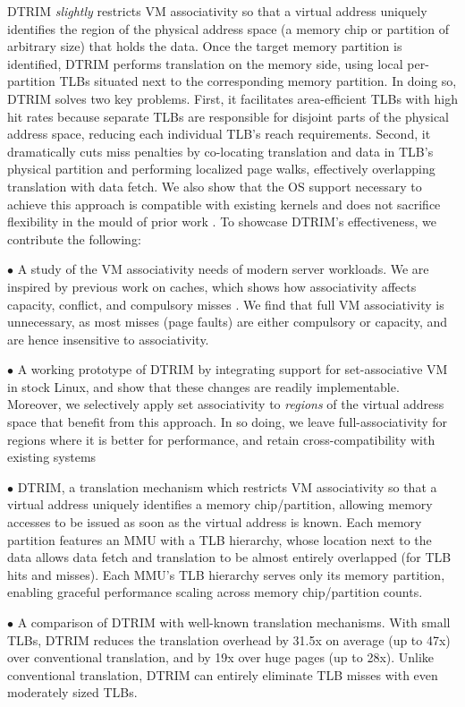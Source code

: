 DTRIM {\it slightly} restricts VM associativity so that a virtual
address uniquely identifies the region of the physical address space
(a memory chip or partition of arbitrary size) that holds the
data. Once the target memory partition is identified, DTRIM performs
translation on the memory side, using local per-partition TLBs situated
next to the corresponding memory partition. In doing so, DTRIM solves two
key problems. First, it facilitates area-efficient TLBs with high hit
rates because separate TLBs are responsible for disjoint parts of the
physical address space, reducing each individual TLB's reach
requirements. Second, it dramatically cuts miss penalties by
co-locating translation and data in TLB's physical partition and
performing localized page walks, effectively overlapping translation
with data fetch. We also show that the OS support necessary to achieve
this approach is compatible with existing kernels and does not
sacrifice flexibility in the mould of prior work \cite{basu:efficient,
  haria:devirtualizing}. To showcase DTRIM's effectiveness, we
contribute the following:

\noindent $\bullet$ A study of the VM associativity needs of modern
server workloads. We are inspired by previous work on caches, which
shows how associativity affects capacity, conflict, and compulsory
misses \cite{hill:case}. We find that full VM associativity is 
unnecessary, as most misses (page faults) are either compulsory or
capacity, and are hence insensitive to associativity. 

\noindent $\bullet$ A working prototype of DTRIM by integrating
support for set-associative VM in stock Linux, and show that these
changes are readily implementable. Moreover, we selectively apply set
associativity to {\it regions} of the virtual address space that
benefit from this approach. In so doing, we leave full-associativity
for regions where it is better for performance, and retain
cross-compatibility with existing systems

\noindent $\bullet$ DTRIM, a translation mechanism which restricts VM
associativity so that a virtual address uniquely identifies a memory
chip/partition, allowing memory accesses to be issued as soon as the
virtual address is known. Each memory partition features an MMU with a
TLB hierarchy, whose location next to the data allows data fetch and
translation to be almost entirely overlapped (for TLB hits and
misses). Each MMU's TLB hierarchy serves only its memory partition,
enabling graceful performance scaling across memory chip/partition
counts.

\noindent $\bullet$ A comparison of DTRIM with well-known translation
mechanisms. With small TLBs, DTRIM reduces the translation overhead 
by 31.5x on average (up to 47x) over conventional translation, and by 19x over huge 
pages (up to 28x). Unlike conventional translation, DTRIM can entirely eliminate TLB 
misses with even moderately sized TLBs.

